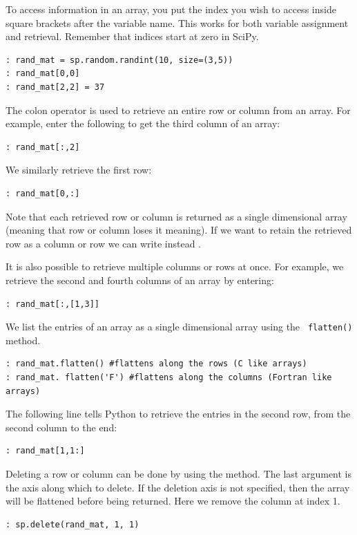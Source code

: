 To access information in an array, you put the index you wish to access inside
square brackets after the variable name. This works for both variable assignment
and retrieval.  Remember that indices start at zero in SciPy.

\begin{lstlisting}
: rand_mat = sp.random.randint(10, size=(3,5))
: rand_mat[0,0]
: rand_mat[2,2] = 37
\end{lstlisting}

The colon operator is used to retrieve an entire row or column from an array. 
For example, enter the following to get the third column of an array:

\begin{lstlisting}
: rand_mat[:,2]
\end{lstlisting}

We similarly retrieve the first row:

\begin{lstlisting}
: rand_mat[0,:]
\end{lstlisting}

Note that each retrieved row or column is returned as a single dimensional array
(meaning that row or column loses it meaning). If we want to retain the retrieved row as a column or row we can write instead .

It is also possible to retrieve multiple columns or rows at once. For example,
we retrieve the second and fourth columns of an array by entering:
\begin{lstlisting}
: rand_mat[:,[1,3]]
\end{lstlisting}

We list the entries of an array as a single dimensional array using the {\tt
flatten()} method.

\begin{lstlisting}
: rand_mat.flatten() #flattens along the rows (C like arrays)
: rand_mat. flatten('F') #flattens along the columns (Fortran like arrays)
\end{lstlisting}

The following line tells Python to retrieve the entries in the second row, from
the second column to the end:

\begin{lstlisting}
: rand_mat[1,1:]    
\end{lstlisting}

Deleting a row or column can be done by using the  method.  The
last argument is the axis along which to delete.  If the deletion axis is not
specified, then the array will be flattened before being returned. Here we
remove the column at index 1.
\begin{lstlisting}
: sp.delete(rand_mat, 1, 1)
\end{lstlisting}
 
